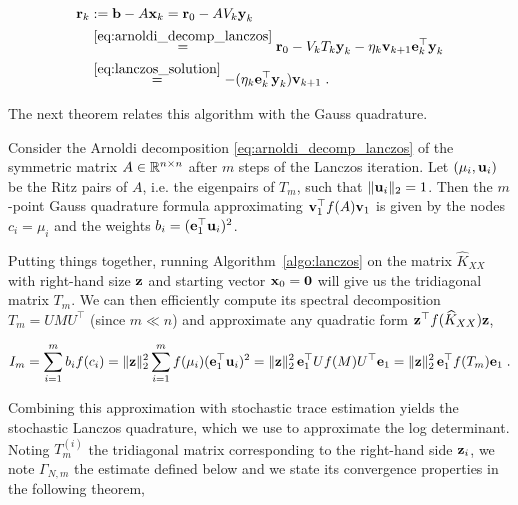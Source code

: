 \documentclass{article}
\begin{document}
\begin{align}
    \boldsymbol{\mathbf{r}}_k &:= \boldsymbol{\mathbf{b}} - A \boldsymbol{\mathbf{x}}_k = \boldsymbol{\mathbf{r}}_0 - A V_k \boldsymbol{\mathbf{y}}_k \nonumber\\
    &\stackrel{\eqref{eq:arnoldi_decomp_lanczos}}{=} \boldsymbol{\mathbf{r}}_0 - V_k T_k \boldsymbol{\mathbf{y}}_k - \eta_k \boldsymbol{\mathbf{v}}_{k+1} \boldsymbol{\mathbf{e}}_k^\top \boldsymbol{\mathbf{y}}_k \nonumber\\
    &\stackrel{\eqref{eq:lanczos_solution}}{=} -(\eta_k \boldsymbol{\mathbf{e}}_k^\top \boldsymbol{\mathbf{y}}_k) \boldsymbol{\mathbf{v}}_{k+1} \label{eq:lanczos_residuals_basis_vec} \;.
\end{align}


The next theorem relates this algorithm with the Gauss quadrature.


\begin{theorem} \label{thm:lanczos_quadrature}
Consider the Arnoldi decomposition \eqref{eq:arnoldi_decomp_lanczos} of the symmetric matrix $A \in \mathbb R^{n\times n}$ after $m$ steps of the Lanczos iteration.
Let $(\mu_i, \boldsymbol{\mathbf{u}}_i)$ be the Ritz pairs of $A$, i.e. the eigenpairs of $T_m$, such that $\Vert \boldsymbol{\mathbf{u}}_i \Vert_2 = 1$. Then the $m$-point Gauss quadrature formula approximating $\boldsymbol{\mathbf{v}}_1^\top f(A) \boldsymbol{\mathbf{v}}_1$ is given by the nodes $c_i = \mu_i$ and the weights $b_i = (\boldsymbol{\mathbf{e}}_1^\top \boldsymbol{\mathbf{u}}_i)^2$.
\end{theorem}

Putting things together, running Algorithm~\ref{algo:lanczos} on the matrix $\widehat K_{XX}$ with right-hand size $\boldsymbol{\mathbf{z}}$ and starting vector $\boldsymbol{\mathbf{x}}_0 = \boldsymbol{\mathbf{0}}$ will give us the tridiagonal matrix $T_m$. We can then efficiently compute its spectral decomposition $T_m = UMU^\top$ (since $m \ll n$) and approximate any quadratic form $\boldsymbol{\mathbf{z}}^\top f(\widehat K_{XX}) \boldsymbol{\mathbf{z}}$,

\begin{equation} \label{eq:lanczos_quadrature}
    I_m = \sum_{i=1}^m b_i f(c_i) = \Vert \boldsymbol{\mathbf{z}} \Vert_2^2 \sum_{i=1}^m f(\mu_i) (\boldsymbol{\mathbf{e}}_1^\top \boldsymbol{\mathbf{u}}_i)^2 
    = \Vert \boldsymbol{\mathbf{z}} \Vert_2^2 \, \boldsymbol{\mathbf{e}}_1^\top U f(M) U^\top \boldsymbol{\mathbf{e}}_1 = \Vert \boldsymbol{\mathbf{z}} \Vert_2^2 \,  \boldsymbol{\mathbf{e}}_1^\top f(T_m) \boldsymbol{\mathbf{e}}_1 \;.
\end{equation}

Combining this approximation with stochastic trace estimation yields the stochastic Lanczos quadrature, which we use to approximate the log determinant. Noting $T_m^{(i)}$ the tridiagonal matrix corresponding to the right-hand side $\boldsymbol{\mathbf{z}}_i$, we note $\Gamma_{N, m}$ the estimate defined below and we state its convergence properties in the following theorem,
\end{document}
